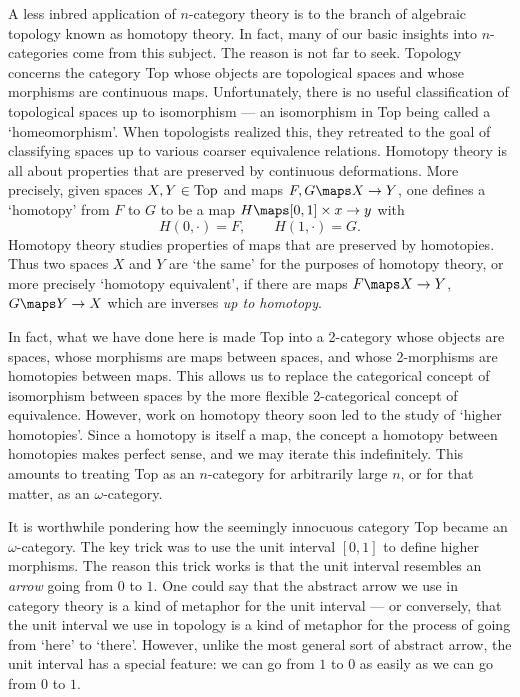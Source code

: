 A less inbred application of $n$-category theory is to the branch of
algebraic topology known as homotopy theory.  In fact, many
of our basic insights into $n$-categories come from this subject.
The reason is not far to seek.  Topology concerns the category Top whose
objects are topological spaces and whose morphisms are continuous
maps.  Unfortunately, there is no useful classification of topological
spaces up to isomorphism --- an isomorphism in Top being called a
`homeomorphism'.  When topologists realized this, they
retreated to the goal of classifying spaces up to various
coarser equivalence relations.  Homotopy theory is all about
properties that are preserved by continuous deformations.  More
precisely, given spaces $X,Y \in {\rm Top}$ and maps $F,G \maps X \to
Y$, one defines a `homotopy' from $F$ to $G$ to be a map 
$H \maps [0,1] \times x \to y$ with 
\[    H(0,\cdot) = F,  \qquad H(1,\cdot) = G. \]
Homotopy theory studies properties of maps that are preserved by
homotopies.  Thus two spaces $X$ and $Y$ are `the same' for the purposes
of homotopy theory, or more precisely `homotopy equivalent', if there
are maps $F \maps X \to Y$, $G \maps Y \to X$ which are inverses {\it up
to homotopy}.  

In fact, what we have done here is made Top into a 2-category whose
objects are spaces, whose morphisms are maps between spaces, and whose
2-morphisms are homotopies between maps.  This allows us to replace the
categorical concept of isomorphism between spaces by the more flexible
2-categorical concept of equivalence.  However, work on homotopy theory
soon led to the study of `higher homotopies'.  Since a homotopy is itself
a map, the concept a homotopy between homotopies makes perfect sense,
and we may iterate this indefinitely.  This amounts to treating Top as
an $n$-category for arbitrarily large $n$, or for that matter, as an
$\omega$-category.

It is worthwhile pondering how the seemingly innocuous category Top
became an $\omega$-category.  The key trick was to use the unit interval
$[0,1]$ to define higher morphisms.  The reason this trick works is that
the unit interval resembles an {\it arrow} going from $0$ to $1$.  One
could say that the abstract arrow we use in category theory is a kind of
metaphor for the unit interval --- or conversely, that the unit interval
we use in topology is a kind of metaphor for the process of going from
`here' to `there'.  However, unlike the most general sort of abstract
arrow, the unit interval has a special feature: we can go from $1$ to
$0$ as easily as we can go from $0$ to $1$.

